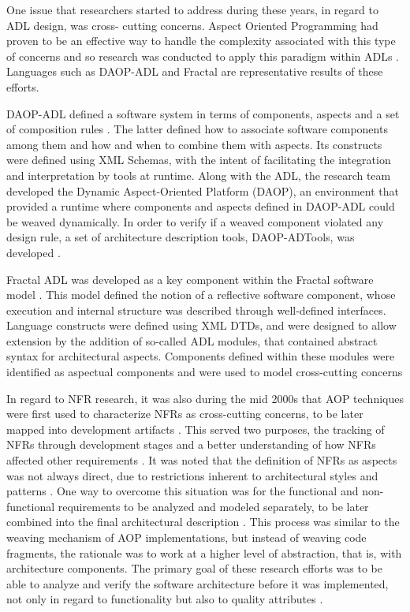 \documentclass[10pt]{article}
\begin{document}
One issue that researchers started to address during these years, in regard to ADL design, was cross- cutting concerns. Aspect Oriented Programming had proven to be an effective way to handle the complexity associated with this type of concerns and so research was conducted to apply this paradigm within ADLs \cite{Pessemier04}. Languages such as DAOP-ADL and Fractal are representative results of these efforts.

DAOP-ADL defined a software system in terms of components, aspects and a set of composition rules \cite{Pinto03}. The latter defined how to associate software components among them and how and when to combine them with aspects. Its constructs were defined using XML Schemas, with the intent of facilitating the integration and interpretation by tools at runtime. Along with the ADL, the research team developed the Dynamic Aspect-Oriented Platform (DAOP), an environment that provided a runtime where components and aspects defined in DAOP-ADL could be weaved dynamically. In order to verify if a weaved component violated any design rule, a set of architecture description tools, DAOP-ADTools, was developed \cite{Pinto03}.

Fractal ADL was developed as a key component within the Fractal software model \cite{Pessemier04}. This model defined the notion of a reflective software component, whose execution and internal structure was described through well-defined interfaces. Language constructs were defined using XML DTDs, and were designed to allow extension by the addition of so-called ADL modules, that contained abstract syntax for architectural aspects. Components defined within these modules were identified as aspectual components and were used to model cross-cutting concerns

In regard to NFR research, it was also during the mid 2000s that AOP techniques were first used to characterize NFRs as cross-cutting concerns, to be later mapped into development artifacts \cite{Sousa03}. This served two purposes, the tracking of NFRs through development stages and a better understanding of how NFRs affected other requirements \cite{Sousa03}. It was noted that the definition of NFRs as aspects was not always direct, due to restrictions inherent to architectural styles and patterns \cite{Xu05}. One way to overcome this situation was for the functional and non-functional requirements to be analyzed and modeled separately, to be later combined into the final architectural description \cite{Xu05}. This process was similar to the weaving mechanism of AOP implementations, but instead of weaving code fragments, the rationale was to work at a higher level of abstraction, that is, with architecture components. The primary goal of these research efforts was to be able to analyze and verify the software architecture before it was implemented, not only in regard to functionality but also to quality attributes \cite{Xu05}.
\end{document}
